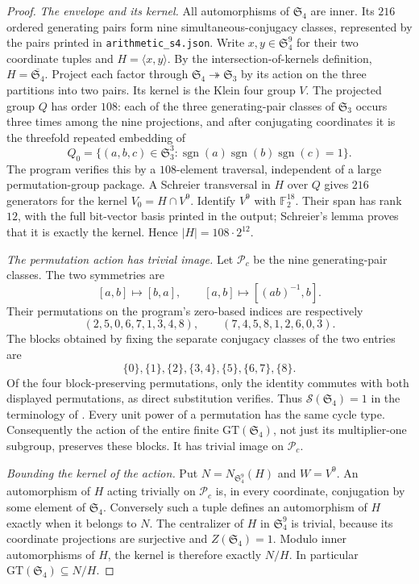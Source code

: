 \begin{proof}
\emph{The envelope and its kernel.}
All automorphisms of $\mathfrak S_4$ are inner. Its $216$ ordered generating
pairs form nine simultaneous-conjugacy classes, represented by the pairs
printed in \texttt{arithmetic\_s4.json}. Write $x,y\in\mathfrak S_4^9$
for their two coordinate tuples and $H=\langle x,y\rangle$. By the
intersection-of-kernels definition, $H=\overline{\mathfrak S_4}$.
Project each factor through $\mathfrak S_4\twoheadrightarrow\mathfrak S_3$
by its action on the three partitions into two pairs. Its kernel is the
Klein four group $V$. The projected group $Q$ has order $108$: each of the
three generating-pair classes of $\mathfrak S_3$ occurs three times among
the nine projections, and after conjugating coordinates it is the
threefold repeated embedding of
\[
 Q_0=\{(a,b,c)\in\mathfrak S_3^3:
           \operatorname{sgn}(a)\operatorname{sgn}(b)
             \operatorname{sgn}(c)=1\}.
 \tag{B.s4.1.2}
\]
The program verifies this by a $108$-element traversal, independent of a
large permutation-group package. A Schreier transversal in $H$ over $Q$
gives $216$ generators for the kernel $V_0=H\cap V^9$. Identify $V^9$
with $\mathbb F_2^{18}$. Their span has rank $12$, with the full bit-vector
basis printed in the output; Schreier's lemma proves that it is exactly
the kernel. Hence $|H|=108\cdot2^{12}$.

\emph{The permutation action has trivial image.}
Let $\mathcal P_c$ be the nine generating-pair classes. The two symmetries
are
\[
 [a,b]\longmapsto[b,a],\qquad
 [a,b]\longmapsto[(ab)^{-1},b].
\]
Their permutations on the program's zero-based indices are respectively
\[
 (2,5,0,6,7,1,3,4,8),\qquad(7,4,5,8,1,2,6,0,3).
\]
The blocks obtained by fixing the separate conjugacy classes of the two
entries are
\[
 \{0\},\{1\},\{2\},\{3,4\},\{5\},\{6,7\},\{8\}.
\]
Of the four block-preserving permutations, only the identity commutes with
both displayed permutations, as direct substitution verifies. Thus
$\mathcal S(\mathfrak S_4)=1$ in the terminology of
\citet[Proposition 4.3, Lemmas 4.5--4.7, \S4.3]{Guillot2015root}.
Every unit power of a permutation has the same cycle type. Consequently
the action of the entire finite $\mathrm{GT}(\mathfrak S_4)$, not just
its multiplier-one subgroup, preserves these blocks. It has trivial image
on $\mathcal P_c$.

\emph{Bounding the kernel of the action.}
Put $N=N_{\mathfrak S_4^9}(H)$ and $W=V^9$.
An automorphism of $H$ acting trivially on $\mathcal P_c$ is, in every
coordinate, conjugation by some element of $\mathfrak S_4$. Conversely
such a tuple defines an automorphism of $H$ exactly when it belongs to
$N$. The centralizer of $H$ in $\mathfrak S_4^9$ is trivial, because its
coordinate projections are surjective and $Z(\mathfrak S_4)=1$.
Modulo inner automorphisms of $H$, the kernel is therefore exactly $N/H$.
In particular $\mathrm{GT}(\mathfrak S_4)\subseteq N/H$.


\end{proof}
